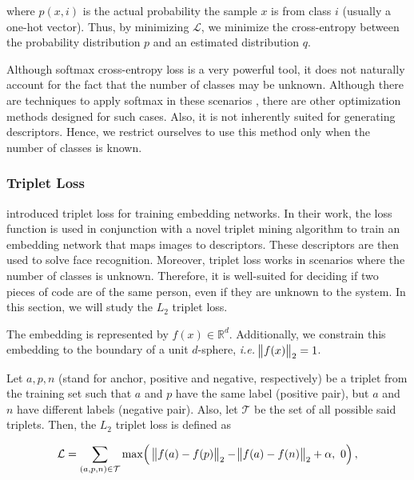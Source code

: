 where $p(x, i)$ is the actual probability the sample $x$ is from class $i$ (usually a one-hot vector). Thus, by minimizing $\mathcal{L}$, we minimize the cross-entropy between the probability distribution $p$ and an estimated distribution $q$.

Although softmax cross-entropy loss is a very powerful tool, it does not naturally account for the fact that the number of classes may be unknown. Although there are techniques to apply softmax in these scenarios \cite{softmax_trick1,softmax_trick2}, there are other optimization methods designed for such cases. Also, it is not inherently suited for generating descriptors. Hence, we restrict ourselves to use this method only when the number of classes is known.

\subsubsection{Triplet Loss}\label{sec:triplet}

 introduced triplet loss for training embedding networks. In their work, the loss function is used in conjunction with a novel triplet mining algorithm to train an embedding network that maps images to descriptors. These descriptors are then used to solve face recognition. Moreover, triplet loss works in scenarios where the number of classes is unknown. Therefore, it is well-suited for deciding if two pieces of code are of the same person, even if they are unknown to the system. In this section, we will study the $L_2$ triplet loss.

The embedding is represented by $f(x) \in \mathbb{R}^d$. Additionally, we constrain this embedding to the boundary of a unit $d$-sphere, \textit{i.e.} $\norm{f(x)}_2 = 1$.

Let $a, p, n$ (stand for anchor, positive and negative, respectively) be a triplet from the training set such that $a$ and $p$ have the same label (positive pair), but $a$ and $n$ have different labels (negative pair). Also, let $\mathcal{T}$ be the set of all possible said triplets. Then, the $L_2$ triplet loss is defined as

\begin{equation}\label{eq:triplet}
\mathcal{L} = \sum_{(a, p, n) \in \mathcal{T}} %
\max\Bigl(\ \norm{f(a) - f(p)}_2 - \norm{f(a) - f(n)}_2 + \alpha,\ 0\Bigr)\,,
\end{equation}


